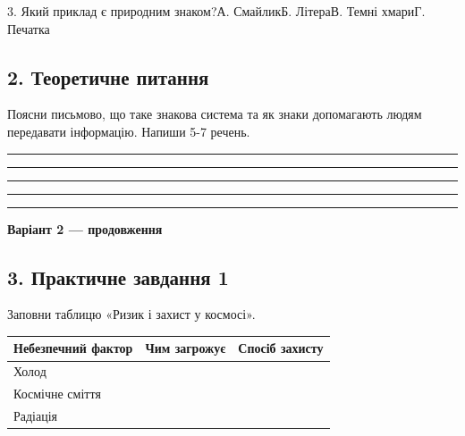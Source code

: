 \documentclass[11pt,a4paper]{article}
\begin{document}
3. Який приклад є природним знаком?\newline А. Смайлик\newline Б. Літера\newline В. Темні хмари\newline Г. Печатка\par

\subsection*{2. Теоретичне питання}

Поясни письмово, що таке знакова система та як знаки допомагають людям передавати інформацію. Напиши 5-7 речень.\par

\rule{0.96\linewidth}{0.4pt}\par

\rule{0.96\linewidth}{0.4pt}\par

\rule{0.96\linewidth}{0.4pt}\par

\rule{0.96\linewidth}{0.4pt}\par

\rule{0.96\linewidth}{0.4pt}\par

\newpage\textbf{Варіант 2 — продовження}\par

\subsection*{3. Практичне завдання 1}

Заповни таблицю «Ризик і захист у космосі».\par

\begin{tabularx}{\linewidth}{|>{\raggedright\arraybackslash}X|>{\raggedright\arraybackslash}X|>{\raggedright\arraybackslash}X|}\hline

\textbf{Небезпечний фактор} & \textbf{Чим загрожує} & \textbf{Спосіб захисту} \\ \hline

Холод &  &  \\ \hline

Космічне сміття &  &  \\ \hline

Радіація &  &  \\ \hline

\end{tabularx}\par
\end{document}
